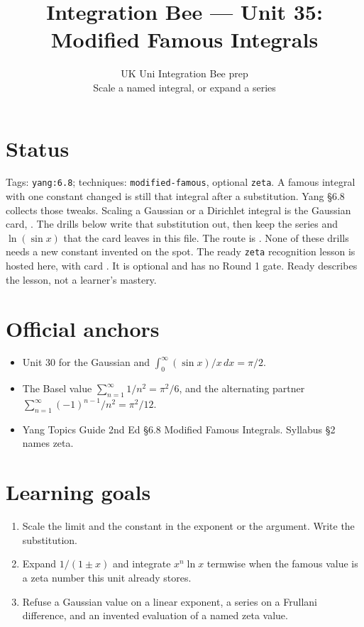 
\title{Integration Bee --- Unit 35:\\ Modified Famous Integrals}
\author{UK Uni Integration Bee prep\\ Scale a named integral, or expand a series}
\date{}

\maketitle
\section*{Status}
Tags: \texttt{yang:6.8}; techniques: \texttt{modified-famous}, optional \texttt{zeta}.
A famous integral with one constant changed is still that integral after a substitution. Yang \S6.8 collects those tweaks. Scaling a Gaussian or a Dirichlet integral is the Gaussian card, . The drills below write that substitution out, then keep the series and $\ln(\sin x)$ that the card leaves in this file. The route is . None of these drills needs a new constant invented on the spot.
The ready \texttt{zeta} recognition lesson is hosted here, with card . It is optional and has no Round 1 gate. Ready describes the lesson, not a learner's mastery.
\section{Official anchors}
\begin{itemize}
\item Unit 30 for the Gaussian and $\int_0^{\infty}(\sin x)/x\,dx=\pi/2$.
\item The Basel value $\sum_{n=1}^{\infty}1/n^2=\pi^2/6$, and the alternating partner $\sum_{n=1}^{\infty}(-1)^{n-1}/n^2=\pi^2/12$.
\item Yang Topics Guide 2nd Ed \S6.8 Modified Famous Integrals. Syllabus \S2 names zeta.
\end{itemize}
\section{Learning goals}
\begin{enumerate}
  \item Scale the limit and the constant in the exponent or the argument. Write the substitution.
  \item Expand $1/(1\pm x)$ and integrate $x^n\ln x$ termwise when the famous value is a zeta number this unit already stores.
  \item Refuse a Gaussian value on a linear exponent, a series on a Frullani difference, and an invented evaluation of a named zeta value.
\end{enumerate}


